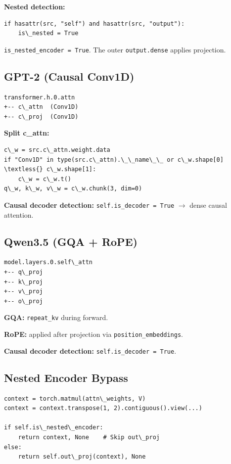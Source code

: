 \textbf{Nested detection:}
\begin{lstlisting}
if hasattr(src, "self") and hasattr(src, "output"):
    is\_nested = True
\end{lstlisting}

\texttt{is\_nested\_encoder = True}. The outer \texttt{output.dense} applies projection.

\subsection{GPT-2 (Causal Conv1D)}

\begin{lstlisting}
transformer.h.0.attn
+-- c\_attn  (Conv1D)
+-- c\_proj  (Conv1D)
\end{lstlisting}

\textbf{Split c\_attn:}
\begin{lstlisting}
c\_w = src.c\_attn.weight.data
if "Conv1D" in type(src.c\_attn).\_\_name\_\_ or c\_w.shape[0] \textless{} c\_w.shape[1]:
    c\_w = c\_w.t()
q\_w, k\_w, v\_w = c\_w.chunk(3, dim=0)
\end{lstlisting}

\textbf{Causal decoder detection:} \texttt{self.is\_decoder = True} $\to$ dense causal 
attention.

\subsection{Qwen3.5 (GQA + RoPE)}

\begin{lstlisting}
model.layers.0.self\_attn
+-- q\_proj
+-- k\_proj
+-- v\_proj
+-- o\_proj
\end{lstlisting}

\textbf{GQA:} \texttt{repeat\_kv} during forward.

\textbf{RoPE:} applied after projection via \texttt{position\_embeddings}.

\textbf{Causal decoder detection:} \texttt{self.is\_decoder = True}.

\subsection{Nested Encoder Bypass}

\begin{lstlisting}
context = torch.matmul(attn\_weights, V)
context = context.transpose(1, 2).contiguous().view(...)

if self.is\_nested\_encoder:
    return context, None    # Skip out\_proj
else:
    return self.out\_proj(context), None
\end{lstlisting}

